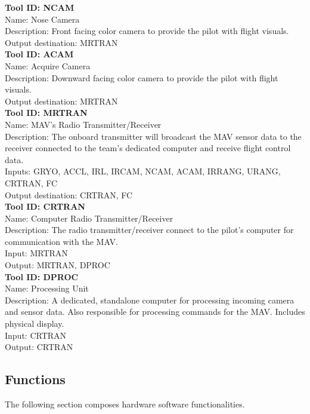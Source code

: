 \documentclass[onecolumn, oneside, letterpaper, draftclsnofoot, 10pt, compsoc]{IEEEtran}
\begin{document}
\noindent
\textbf{Tool ID: NCAM}\\
Name: Nose Camera\\
Description: Front facing color camera to provide the pilot with flight visuals.\\
Output destination: MRTRAN\\

\noindent
\textbf{Tool ID: ACAM}\\
Name: Acquire Camera\\
Description: Downward facing color camera to provide the pilot with flight visuals.\\
Output destination: MRTRAN\\

\noindent
\textbf{Tool ID: MRTRAN}\\
Name: MAV’s Radio Transmitter/Receiver\\
Description: The onboard transmitter will broadcast the MAV sensor data to the receiver connected to the team’s dedicated computer and receive flight control data.\\
Inputs: GRYO, ACCL, IRL, IRCAM, NCAM, ACAM, IRRANG, URANG, CRTRAN, FC\\
Output destination: CRTRAN, FC\\

\noindent
\textbf{Tool ID: CRTRAN}\\
Name: Computer Radio Transmitter/Receiver\\
Description: The radio transmitter/receiver connect to the pilot’s computer for communication with the MAV.\\
Input: MRTRAN\\
Output: MRTRAN, DPROC\\

\noindent
\textbf{Tool ID: DPROC}\\
Name: Processing Unit\\
Description: A dedicated, standalone computer for processing incoming camera and sensor data. Also responsible for processing commands for the MAV. Includes physical display.\\
Input: CRTRAN\\
Output: CRTRAN

\subsection{Functions}
The following section composes hardware software functionalities.\\
\end{document}
